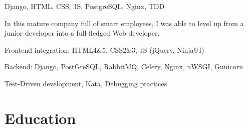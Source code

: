 \documentclass[a4paper,11pt]{cv4tw}%
\begin{document}
{Django, HTML, CSS, JS, PostgreSQL, Nginx, TDD}
	{ In this mature company full of smart employees, I was able to level up
        from a junior developer into a full-fledged Web developer.
	\begin{missions}
    \item Frontend integration: HTML4\&5, CSS2\&3, JS (jQuery, NinjaUI)
    \item Backend: Django, PostGreSQL, RabbitMQ, Celery, Nginx, uWSGI, Gunicorn
    \item Test-Driven development, Kata, Debugging practices
	\end{missions}
}
\section{Education}

\end{document}
